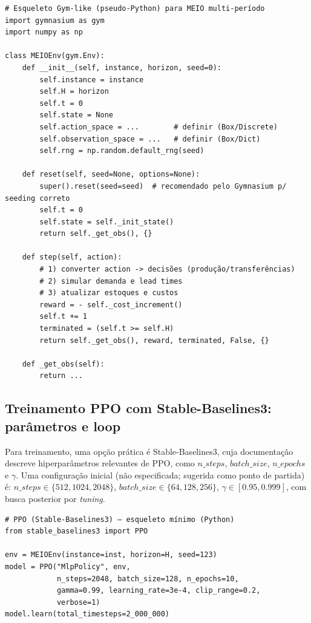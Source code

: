 \begin{verbatim}
# Esqueleto Gym-like (pseudo-Python) para MEIO multi-período
import gymnasium as gym
import numpy as np

class MEIOEnv(gym.Env):
    def __init__(self, instance, horizon, seed=0):
        self.instance = instance
        self.H = horizon
        self.t = 0
        self.state = None
        self.action_space = ...        # definir (Box/Discrete)
        self.observation_space = ...   # definir (Box/Dict)
        self.rng = np.random.default_rng(seed)

    def reset(self, seed=None, options=None):
        super().reset(seed=seed)  # recomendado pelo Gymnasium p/ seeding correto
        self.t = 0
        self.state = self._init_state()
        return self._get_obs(), {}

    def step(self, action):
        # 1) converter action -> decisões (produção/transferências)
        # 2) simular demanda e lead times
        # 3) atualizar estoques e custos
        reward = - self._cost_increment()
        self.t += 1
        terminated = (self.t >= self.H)
        return self._get_obs(), reward, terminated, False, {}

    def _get_obs(self):
        return ...
\end{verbatim}

\subsection{Treinamento PPO com Stable-Baselines3: parâmetros e loop}

Para treinamento, uma opção prática é Stable-Baselines3, cuja documentação descreve hiperparâmetros relevantes de PPO, como \(n\_steps\), \(batch\_size\), \(n\_epochs\) e \(\gamma\). \cite{SB3PPO} Uma configuração inicial (não especificada; sugerida como ponto de partida) é: \(n\_steps\in\{512,1024,2048\}\), \(batch\_size\in\{64,128,256\}\), \(\gamma\in[0.95,0.999]\), com busca posterior por \emph{tuning}.

\begin{verbatim}
# PPO (Stable-Baselines3) – esqueleto mínimo (Python)
from stable_baselines3 import PPO

env = MEIOEnv(instance=inst, horizon=H, seed=123)
model = PPO("MlpPolicy", env,
            n_steps=2048, batch_size=128, n_epochs=10,
            gamma=0.99, learning_rate=3e-4, clip_range=0.2,
            verbose=1)
model.learn(total_timesteps=2_000_000)
\end{verbatim}

